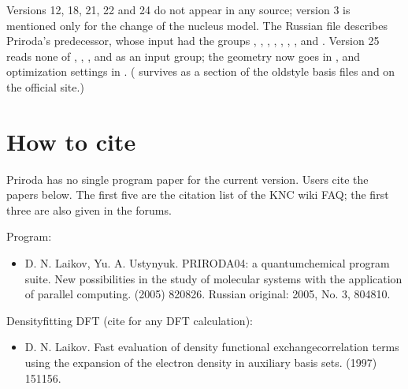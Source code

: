 \documentclass[letterpaper,10pt,english,openany,oneside]{sphinxmanual}
\begin{document}
\sphinxAtStartPar
Versions 12, 18, 21, 22 and 24 do not appear in any source; version 3 is mentioned only for the change of the nucleus
model. The Russian file  describes Priroda’s predecessor, whose input had the groups ,
, , , , , ,  and . Version 25 reads none
of , , ,  and  as an input group; the geometry now goes in , and optimization settings in
. ( survives as a section of the old\sphinxhyphen{}style basis files  and  on the official
site.)




\section{How to cite}
\label{\detokenize{start/about:how-to-cite}}\label{\detokenize{start/about:id2}}
\sphinxAtStartPar
Priroda has no single program paper for the current version. Users cite the papers below. The first five are the
citation list of the KNC wiki FAQ; the first three are also given in the forums.

\sphinxAtStartPar
Program:
\begin{itemize}
\item {} 
\sphinxAtStartPar
D. N. Laikov, Yu. A. Ustynyuk. PRIRODA\sphinxhyphen{}04: a quantum\sphinxhyphen{}chemical program suite. New possibilities in the study of
molecular systems with the application of parallel computing.   (2005) 820\textendash{}826.
Russian original:  2005, No. 3, 804\textendash{}810. 

\end{itemize}

\sphinxAtStartPar
Density\sphinxhyphen{}fitting DFT (cite for any DFT calculation):
\begin{itemize}
\item {} 
\sphinxAtStartPar
D. N. Laikov. Fast evaluation of density functional exchange\sphinxhyphen{}correlation terms using the expansion of the electron
density in auxiliary basis sets.   (1997) 151\textendash{}156. 

\end{itemize}
\end{document}
